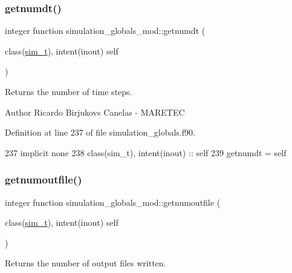 \subsubsection{\texorpdfstring{getnumdt()}{getnumdt()}}
{\footnotesize\ttfamily integer function simulation\+\_\+globals\+\_\+mod\+::getnumdt (\begin{DoxyParamCaption}\item[{class(\mbox{\hyperlink{structsimulation__globals__mod_1_1sim__t}{sim\+\_\+t}}), intent(inout)}]{self }\end{DoxyParamCaption})\hspace{0.3cm}{\ttfamily [private]}}



Returns the number of time steps. 

\begin{DoxyAuthor}{Author}
Ricardo Birjukovs Canelas -\/ M\+A\+R\+E\+T\+EC 
\end{DoxyAuthor}


Definition at line 237 of file simulation\+\_\+globals.\+f90.


\begin{DoxyCode}
237     \textcolor{keywordtype}{implicit none}
238     \textcolor{keywordtype}{class}(sim\_t), \textcolor{keywordtype}{intent(inout)} :: self
239     getnumdt = self%
\end{DoxyCode}
\mbox{\label{namespacesimulation__globals__mod_a8114d54a4c7e4cf505b30d51f4bdccdd}} 
\subsubsection{\texorpdfstring{getnumoutfile()}{getnumoutfile()}}
{\footnotesize\ttfamily integer function simulation\+\_\+globals\+\_\+mod\+::getnumoutfile (\begin{DoxyParamCaption}\item[{class(\mbox{\hyperlink{structsimulation__globals__mod_1_1sim__t}{sim\+\_\+t}}), intent(inout)}]{self }\end{DoxyParamCaption})\hspace{0.3cm}{\ttfamily [private]}}



Returns the number of output files written. 

